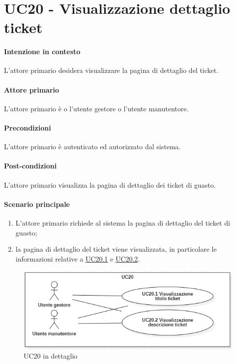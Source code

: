 \section{UC20 - Visualizzazione dettaglio ticket}\label{uc:20}
\paragraph{Intenzione in contesto} L'attore primario desidera visualizzare la pagina di dettaglio del ticket.

\paragraph{Attore primario} L'attore primario è o l'utente gestore o l'utente manutentore.
\paragraph{Precondizioni} L'attore primario è autenticato ed autorizzato dal sistema.
\paragraph{Post-condizioni} L'attore primario visualizza la pagina di dettaglio dei ticket di guasto.
\paragraph{Scenario principale}
\begin{enumerate}
    \item L'attore primario richiede al sistema la pagina di dettaglio del ticket di guasto;
    \item la pagina di dettaglio del ticket viene visualizzata, in particolare le informazioni relative a \hyperref[uc:20.1]{UC20.1} e \hyperref[uc:20.2]{UC20.2}.
\end{enumerate}

\begin{figure}[h]
    \includegraphics[width=\textwidth]{contenuti/img/casi_uso_grafici-uc20.png}
    \caption{UC20 in dettaglio}
    \label{fig:uc20}
\end{figure}


